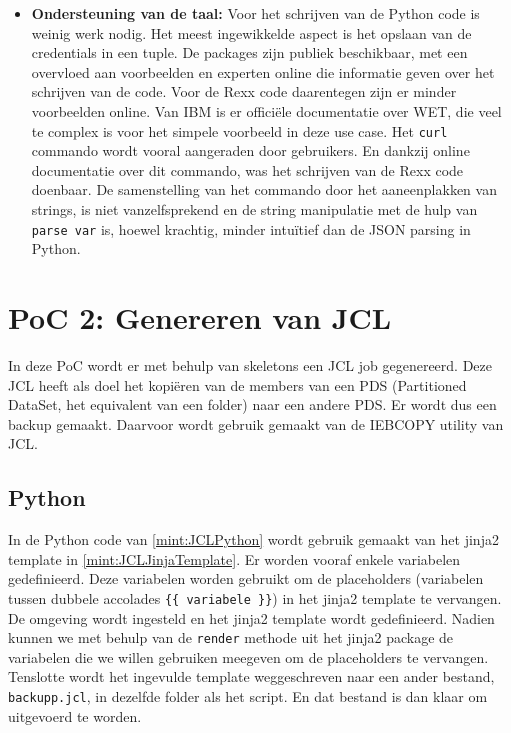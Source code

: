 \begin{itemize}
\item \textbf{Ondersteuning van de taal:} 
Voor het schrijven van de Python code is weinig werk nodig. Het meest ingewikkelde aspect is het opslaan van de credentials in een tuple. De packages zijn publiek beschikbaar, met een overvloed aan voorbeelden en experten online die informatie geven over het schrijven van de code. Voor de Rexx code daarentegen zijn er minder voorbeelden online. Van IBM is er officiële documentatie over WET, die veel te complex is voor het simpele voorbeeld in deze use case. Het \texttt{curl} commando wordt vooral aangeraden door gebruikers. En dankzij online documentatie over dit commando, was het schrijven van de Rexx code doenbaar. De samenstelling van het commando door het aaneenplakken van strings, is niet vanzelfsprekend en de string manipulatie met de hulp van \texttt{parse var} is, hoewel krachtig, minder intuïtief dan de JSON parsing in Python.
 
\end{itemize}

\section{PoC 2: Genereren van JCL}
In deze PoC wordt er met behulp van skeletons een JCL job gegenereerd. Deze JCL heeft als doel het kopiëren van de members van een PDS (Partitioned DataSet, het equivalent van een folder) naar een andere PDS. Er wordt dus een backup gemaakt. Daarvoor wordt gebruik gemaakt van de IEBCOPY utility van JCL.

\subsection{Python}
In de Python code van \ref{mint:JCLPython} wordt gebruik gemaakt van het jinja2 template in \ref{mint:JCLJinjaTemplate}. Er worden vooraf enkele variabelen gedefinieerd. Deze variabelen worden gebruikt om de placeholders (variabelen tussen dubbele accolades \texttt{\{\{ variabele \}\}}) in het jinja2 template te vervangen. De omgeving wordt ingesteld en het jinja2 template wordt gedefinieerd. Nadien kunnen we met behulp van de \texttt{render} methode uit het jinja2 package de variabelen die we willen gebruiken meegeven om de placeholders te vervangen.
Tenslotte wordt het ingevulde template weggeschreven naar een ander bestand, \texttt{backupp.jcl}, in dezelfde folder als het script. En dat bestand is dan klaar om uitgevoerd te worden.

